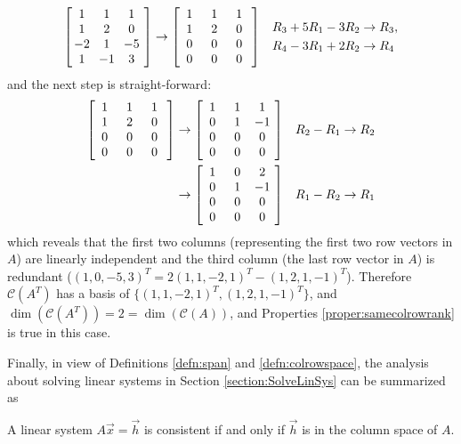 \begin{solution}
\begin{align*}
\left[\begin{array}{@{\;}wc{10pt}wc{10pt}wc{10pt}wc{10pt}@{\;}}
1 & 1 & 1 \\
1 & 2 & 0 \\
-2 & 1 & -5 \\
1 & -1 & 3
\end{array}\right] 
&\rightarrow
\left[\begin{array}{@{\;}wc{10pt}wc{10pt}wc{10pt}wc{10pt}@{\;}}
1 & 1 & 1 \\
1 & 2 & 0 \\
0 & 0 & 0 \\
0 & 0 & 0
\end{array}\right] 
& \begin{aligned}
R_3 + 5R_1 - 3R_2 &\to R_3, \\
R_4 - 3R_1 + 2R_2 &\to R_4
\end{aligned}
\end{align*}
and the next step is straight-forward:
\begin{align*}
\left[\begin{array}{@{\;}wc{10pt}wc{10pt}wc{10pt}wc{10pt}@{\;}}
1 & 1 & 1 \\
1 & 2 & 0 \\
0 & 0 & 0 \\
0 & 0 & 0
\end{array}\right] 
&\rightarrow
\left[\begin{array}{@{\;}wc{10pt}wc{10pt}wc{10pt}wc{10pt}@{\;}}
1 & 1 & 1 \\
0 & 1 & -1 \\
0 & 0 & 0 \\
0 & 0 & 0
\end{array}\right] 
& R_2 - R_1 \to R_2 \\
&\rightarrow
\left[\begin{array}{@{\;}wc{10pt}wc{10pt}wc{10pt}wc{10pt}@{\;}}
1 & 0 & 2 \\
0 & 1 & -1 \\
0 & 0 & 0 \\
0 & 0 & 0
\end{array}\right] 
& R_1 - R_2 \to R_1
\end{align*}
which reveals that the first two columns (representing the first two row vectors in $A$) are linearly independent and the third column (the last row vector in $A$) is redundant ($(1,0,-5,3)^T = 2(1,1,-2,1)^T-(1,2,1,-1)^T$). Therefore $\mathcal{C}(A^T)$ has a basis of $\{(1,1,-2,1)^T, (1,2,1,-1)^T\}$, and $\dim(\mathcal{C}(A^T)) = 2 = \dim(\mathcal{C}(A))$, and Properties \ref{proper:samecolrowrank} is true in this case.
\end{solution}
Finally, in view of Definitions \ref{defn:span} and \ref{defn:colrowspace}, the analysis about solving linear systems in Section \ref{section:SolveLinSys} can be summarized as
\begin{proper}
\label{proper:consistentcolspace}
A linear system $A\vec{x} = \vec{h}$ is consistent if and only if $\vec{h}$ is in the column space of $A$.
\end{proper}

